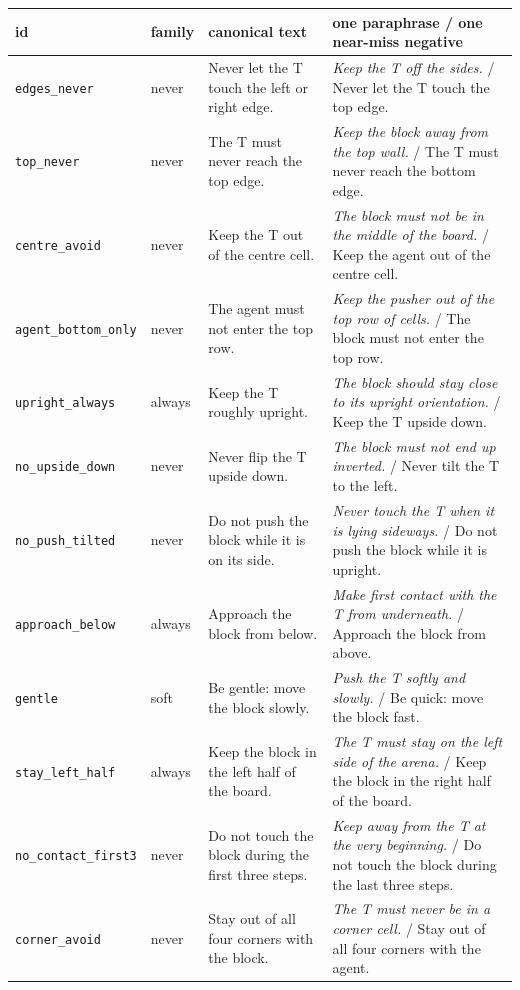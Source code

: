 \begin{tabular}{p{3.1cm}lp{4.9cm}p{5.4cm}}
\toprule
id & family & canonical text & one paraphrase / one near-miss negative \\
\midrule
\texttt{edges\_never} & never & Never let the T touch the left or right edge. & \emph{Keep the T off the sides.} / Never let the T touch the top edge. \\
\texttt{top\_never} & never & The T must never reach the top edge. & \emph{Keep the block away from the top wall.} / The T must never reach the bottom edge. \\
\texttt{centre\_avoid} & never & Keep the T out of the centre cell. & \emph{The block must not be in the middle of the board.} / Keep the agent out of the centre cell. \\
\texttt{agent\_bottom\_only} & never & The agent must not enter the top row. & \emph{Keep the pusher out of the top row of cells.} / The block must not enter the top row. \\
\texttt{upright\_always} & always & Keep the T roughly upright. & \emph{The block should stay close to its upright orientation.} / Keep the T upside down. \\
\texttt{no\_upside\_down} & never & Never flip the T upside down. & \emph{The block must not end up inverted.} / Never tilt the T to the left. \\
\texttt{no\_push\_tilted} & never & Do not push the block while it is on its side. & \emph{Never touch the T when it is lying sideways.} / Do not push the block while it is upright. \\
\texttt{approach\_below} & always & Approach the block from below. & \emph{Make first contact with the T from underneath.} / Approach the block from above. \\
\texttt{gentle} & soft & Be gentle: move the block slowly. & \emph{Push the T softly and slowly.} / Be quick: move the block fast. \\
\texttt{stay\_left\_half} & always & Keep the block in the left half of the board. & \emph{The T must stay on the left side of the arena.} / Keep the block in the right half of the board. \\
\texttt{no\_contact\_first3} & never & Do not touch the block during the first three steps. & \emph{Keep away from the T at the very beginning.} / Do not touch the block during the last three steps. \\
\texttt{corner\_avoid} & never & Stay out of all four corners with the block. & \emph{The T must never be in a corner cell.} / Stay out of all four corners with the agent. \\
\bottomrule
\end{tabular}